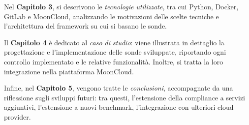 Nel \textbf{Capitolo 3}, si descrivono le \textit{tecnologie utilizzate}, tra cui Python, Docker, GitLab e MoonCloud, analizzando le motivazioni delle scelte tecniche e l'architettura del framework su cui si basano le sonde.

Il \textbf{Capitolo 4} è dedicato al \textit{caso di studio}: viene illustrata in dettaglio la progettazione e l'implementazione delle sonde sviluppate, riportando ogni controllo implementato e le relative funzionalità. Inoltre, si tratta la loro integrazione nella piattaforma MoonCloud.

Infine, nel \textbf{Capitolo 5}, vengono tratte le \textit{conclusioni}, accompagnate da una riflessione sugli sviluppi futuri: tra questi, l'estensione della compliance a servizi aggiuntivi, l'estensione a nuovi benchmark, l'integrazione con ulteriori cloud provider.

